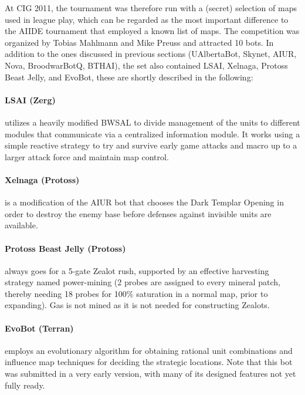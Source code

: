 \documentclass[journal]{IEEEtran}
\begin{document}
At CIG 2011, the tournament was therefore run with a (secret) selection
of maps used in league play, which can be regarded as the most important
difference to the AIIDE tournament that employed a known list of maps.
The competition was organized by Tobias Mahlmann and Mike
Preuss and attracted 10 bots. In addition to the ones discussed in previous
sections (UAlbertaBot, Skynet, AIUR, Nova, BroodwarBotQ, BTHAI), 
the set also contained LSAI, Xelnaga, Protoss Beast Jelly, and EvoBot,
these are shortly described in the following:

\paragraph*{LSAI (Zerg)} utilizes a heavily modified BWSAL to divide management
 of the units to different modules that communicate via a centralized information
 module. It works using a simple reactive strategy to try and survive early game
 attacks and macro up to a larger attack force and maintain map control.
 
\paragraph*{Xelnaga (Protoss)} is a modification of the AIUR bot that chooses the 
Dark Templar Opening in order to destroy the enemy base before defenses against
invisible units are available. 

\paragraph*{Protoss Beast Jelly (Protoss)}
always goes for a 5-gate Zealot rush, supported by an effective harvesting 
strategy named power-mining (2 probes are assigned to every mineral patch,
thereby needing 18 probes for 100\% saturation in a normal map, prior
to expanding). Gas is not mined as it is not needed for constructing Zealots.

\paragraph*{EvoBot (Terran)} employs an evolutionary algorithm for obtaining rational
 unit combinations and influence map techniques for deciding the strategic locations. Note
 that this bot was submitted in a very early version, with many of its designed features not
 yet fully ready. 
\end{document}
